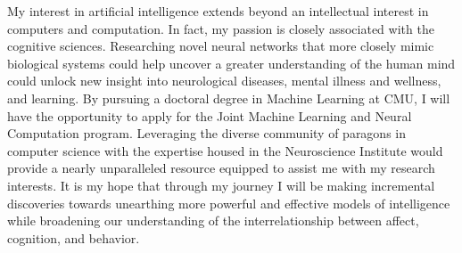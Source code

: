 \documentclass[10pt]{article}
\begin{document}
My interest in artificial intelligence extends beyond an intellectual interest in computers and computation. In fact, my passion is closely
associated with the cognitive sciences.  Researching novel neural networks that more closely mimic biological systems could help uncover
a greater understanding of the human mind could unlock new insight into neurological diseases, mental illness and wellness, and learning. By
pursuing a doctoral degree in Machine Learning at CMU, I will have the opportunity to apply for the Joint Machine Learning and Neural
Computation program. Leveraging the diverse community of paragons in computer science with the expertise housed in the Neuroscience
Institute would provide a nearly unparalleled resource equipped to assist me with my research interests. It is my hope that through my
journey I will be making incremental discoveries towards unearthing more powerful and effective models of intelligence while broadening our
understanding of the interrelationship between affect, cognition, and behavior.
\end{document}
